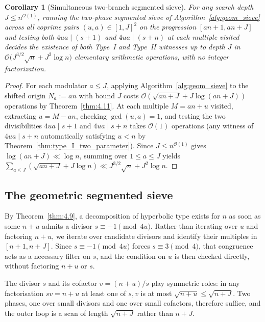 \documentclass[11pt, a4paper]{article}
\theoremstyle{plain}
\newtheorem{corollary}[theorem]{Corollary}
\theoremstyle{definition}
\begin{document}
\begin{corollary}[Simultaneous two-branch segmented sieve]\label{cor:simultaneous_sieve}
For any search depth $J\le n^{\mathcal{O}(1)}$, running the two-phase segmented sieve of Algorithm~\ref{alg:geom_sieve} across all coprime pairs $(u,a)\in[1,J]^{2}$ on the progression $[an+1,an+J]$ and testing both $4ua\mid(s+1)$ and $4ua\mid(s+n)$ at each multiple visited decides the existence of both Type~I and Type~II witnesses up to depth $J$ in $\mathcal{O}\big(J^{3/2}\sqrt{n}+J^{2}\log n\big)$ elementary arithmetic operations, with no integer factorization.
\end{corollary}
\begin{proof}
For each modulator $a\le J$, applying Algorithm~\ref{alg:geom_sieve} to the shifted origin $N_a:=an$ with bound $J$ costs $\mathcal{O}(\sqrt{an+J}+J\log(an+J))$ operations by Theorem~\ref{thm:4.11}. At each multiple $M=an+u$ visited, extracting $u=M-an$, checking $\gcd(u,a)=1$, and testing the two divisibilities $4ua\mid s+1$ and $4ua\mid s+n$ takes $\mathcal{O}(1)$ operations (any witness of $4ua\mid s+n$ automatically satisfying $u<n$ by Theorem~\ref{thm:type_I_two_parameter}). Since $J\le n^{\mathcal{O}(1)}$ gives $\log(an+J)\ll\log n$, summing over $1\le a\le J$ yields $\sum_{a\le J}(\sqrt{an+J}+J\log n)\ll J^{3/2}\sqrt{n}+J^{2}\log n$.
\end{proof}

\subsection{The geometric segmented sieve} \label{sec:4.4}

By Theorem~\ref{thm:4.9}, a decomposition of hyperbolic type exists for $n$ as soon as some $n+u$ admits a divisor $s \equiv -1 \pmod{4u}$. Rather than iterating over $u$ and factoring $n+u$, we iterate over candidate divisors and identify their multiples in $[n+1, n+J]$. Since $s \equiv -1 \pmod{4u}$ forces $s \equiv 3 \pmod 4$, that congruence acts as a necessary filter on $s$, and the condition on $u$ is then checked directly, without factoring $n+u$ or $s$.

The divisor $s$ and its cofactor $v=(n+u)/s$ play symmetric roles: in any factorisation $sv=n+u$ at least one of $s,v$ is at most $\sqrt{n+u}\le\sqrt{n+J}$. Two phases, one over small divisors and one over small cofactors, therefore suffice, and the outer loop is a scan of length $\sqrt{n+J}$ rather than $n+J$.
\end{document}
